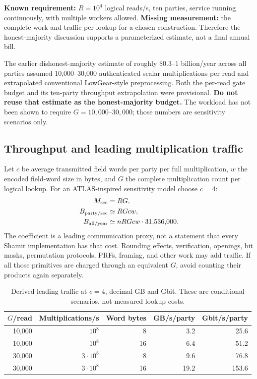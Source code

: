 \documentclass[11pt]{article}
\begin{document}
\textbf{Known requirement:} $R=10^4$ logical reads/s, ten parties, service running
continuously, with multiple workers allowed. \textbf{Missing measurement:} the
complete work and traffic per lookup for a chosen construction. Therefore the
honest-majority discussion supports a parameterized estimate, not a final
annual bill.

The earlier dishonest-majority estimate of roughly \$0.3--1 billion/year across
all parties assumed 10,000--30,000 authenticated scalar multiplications per
read and extrapolated conventional LowGear-style preprocessing. Both the
per-read gate budget and its ten-party throughput extrapolation were provisional.
\textbf{Do not reuse that estimate as the honest-majority budget.}
The workload has not been shown to require $G=10{,}000$--$30{,}000$; those numbers
are sensitivity scenarios only.

\subsection{Throughput and leading multiplication traffic}

Let $c$ be average transmitted field words per party per full multiplication,
$w$ the encoded field-word size in bytes, and $G$ the complete multiplication
count per logical lookup. For an ATLAS-inspired sensitivity model choose $c=4$:
\begin{align}
M_{\rm sec}&=RG,\\
B_{\rm party/sec}&\simeq RGcw,\label{eq:bandwidth}\\
B_{\rm all/year}&\simeq nRGcw\cdot31{,}536{,}000.
\end{align}
The coefficient is a leading communication proxy, not a statement that every
Shamir implementation has that cost. Rounding effects, verification, openings,
bit masks, permutation protocols, PRFs, framing, and other work may add traffic.
If all those primitives are charged through an equivalent $G$, avoid counting
their products again separately.

\begin{table}[htbp]
\centering
\begin{tabular}{@{}rrrrr@{}}
\toprule
$G$/read & Multiplications/s & Word bytes & GB/s/party & Gbit/s/party \\
\midrule
10,000 & $10^8$ & 8 & 3.2 & 25.6 \\
10,000 & $10^8$ & 16 & 6.4 & 51.2 \\
30,000 & $3\cdot10^8$ & 8 & 9.6 & 76.8 \\
30,000 & $3\cdot10^8$ & 16 & 19.2 & 153.6 \\
\bottomrule
\end{tabular}
\caption{Derived leading traffic at $c=4$, decimal GB and Gbit. These are
conditional scenarios, not measured lookup costs.}
\end{table}
\end{document}
